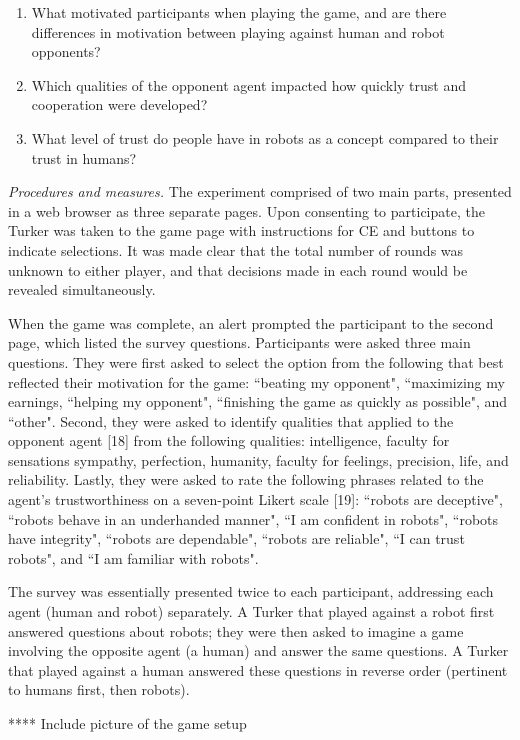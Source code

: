 \documentclass{sig-alternate}
\begin{document}
\begin{enumerate}
\item What motivated participants when playing the game, and are there differences in motivation between playing against human and robot opponents? 
\item Which qualities of the opponent agent impacted how quickly trust and cooperation were developed?
\item What level of trust do people have in robots as a concept compared to their trust in humans?
\end{enumerate}

\textit{Procedures and measures. } The experiment comprised of two main parts, presented in a web browser as three separate pages. Upon consenting to participate, the Turker was taken to the game page with instructions for CE and buttons to indicate selections. It was made clear that the total number of rounds was unknown to either player, and that decisions made in each round would be revealed simultaneously. 

When the game was complete, an alert prompted the participant to the second page, which listed the survey questions. Participants were asked three main questions. They were first asked to select the option from the following that best reflected their motivation for the game: ``beating my opponent", ``maximizing my earnings, ``helping my opponent", ``finishing the game as quickly as possible", and ``other". Second, they were asked to identify qualities that applied to the opponent agent [18] from the following qualities: intelligence, faculty for sensations sympathy, perfection, humanity, faculty for feelings, precision, life, and reliability. Lastly, they were asked to rate the following phrases related to the agent's trustworthiness on a seven-point Likert scale [19]: ``robots are deceptive", ``robots behave in an underhanded manner", ``I am confident in robots", ``robots have integrity", ``robots are dependable", ``robots are reliable", ``I can trust robots", and ``I am familiar with robots".

The survey was essentially presented twice to each participant, addressing each agent (human and robot) separately. A Turker that played against a robot first answered questions about robots; they were then asked to imagine a game involving the opposite agent (a human) and answer the same questions. A Turker that played against a human answered these questions in reverse order (pertinent to humans first, then robots). 


**** Include picture of the game setup\\


\end{document}
